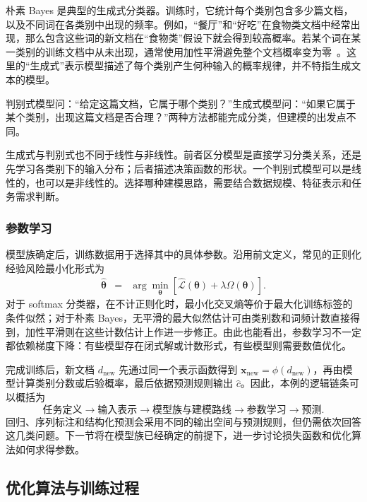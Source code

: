 朴素 Bayes 是典型的生成式分类器。训练时，它统计每个类别包含多少篇文档，以及不同词在各类别中出现的频率。例如，“餐厅”和“好吃”在食物类文档中经常出现，那么包含这些词的新文档在“食物类”假设下就会得到较高概率。若某个词在某一类别的训练文档中从未出现，通常使用加性平滑避免整个文档概率变为零~\cite{Chen-and-Goodman:1999}。这里的“生成式”表示模型描述了每个类别产生何种输入的概率规律，并不特指生成文本的模型。

\begin{importantnote}
  判别式模型问：“给定这篇文档，它属于哪个类别？”生成式模型问：“如果它属于某个类别，出现这篇文档是否合理？”两种方法都能完成分类，但建模的出发点不同。
\end{importantnote}

生成式与判别式也不同于线性与非线性。前者区分模型是直接学习分类关系，还是先学习各类别下的输入分布；后者描述决策函数的形状。一个判别式模型可以是线性的，也可以是非线性的。选择哪种建模思路，需要结合数据规模、特征表示和任务需求判断。

\subsubsection{参数学习}

模型族确定后，训练数据用于选择其中的具体参数。沿用前文定义，常见的正则化经验风险最小化形式为
\begin{eqnarray}
\hat{\boldsymbol{\theta}}
& = &
\arg\min_{\boldsymbol{\theta}}
\left[
\hat{\mathcal{L}}(\boldsymbol{\theta})
+\lambda\Omega(\boldsymbol{\theta})
\right].
\end{eqnarray}
对于 softmax 分类器，在不计正则化时，最小化交叉熵等价于最大化训练标签的条件似然；对于朴素 Bayes，无平滑的最大似然估计可由类别数和词频计数直接得到，加性平滑则在这些计数估计上作进一步修正。由此也能看出，参数学习不一定都依赖梯度下降：有些模型存在闭式解或计数形式，有些模型则需要数值优化。

完成训练后，新文档 $d_{\mathrm{new}}$ 先通过同一个表示函数得到 $\mathbf{x}_{\mathrm{new}}=\phi(d_{\mathrm{new}})$，再由模型计算类别分数或后验概率，最后依据预测规则输出 $\hat{c}$。因此，本例的逻辑链条可以概括为
\[
\text{任务定义}
\longrightarrow
\text{输入表示}
\longrightarrow
\text{模型族与建模路线}
\longrightarrow
\text{参数学习}
\longrightarrow
\text{预测}.
\]
回归、序列标注和结构化预测会采用不同的输出空间与预测规则，但仍需依次回答这几类问题。下一节将在模型族已经确定的前提下，进一步讨论损失函数和优化算法如何求得参数。

\subsection{优化算法与训练过程}


